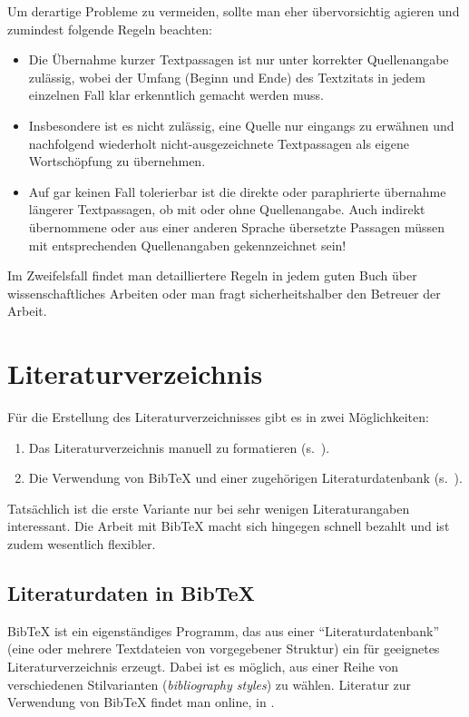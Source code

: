 Um derartige Probleme zu vermeiden, sollte man eher übervorsichtig agieren und zumindest folgende Regeln beachten:
%
\begin{itemize}
\item
Die Übernahme kurzer Textpassagen ist nur unter korrekter Quellenangabe zulässig, wobei der Umfang (Beginn und Ende) des Textzitats in jedem einzelnen Fall klar erkenntlich gemacht werden muss. 
\item
Insbesondere ist es nicht zulässig, eine Quelle nur eingangs zu erwähnen und nachfolgend wiederholt nicht-ausgezeichnete Textpassagen als eigene Wortschöpfung zu übernehmen. 
\item
Auf gar keinen Fall tolerierbar ist die direkte oder paraphrierte übernahme längerer Textpassagen, ob mit oder ohne Quellenangabe. Auch indirekt übernommene oder aus einer anderen Sprache übersetzte Passagen müssen mit entsprechenden Quellenangaben gekennzeichnet sein! 
\end{itemize}
%
Im Zweifelsfall findet man detailliertere Regeln in jedem guten Buch über wissenschaftliches Arbeiten oder man fragt sicherheitshalber den Betreuer der Arbeit.



\section{Literaturverzeichnis}

Für die Erstellung des Literaturverzeichnisses gibt es in \latex zwei
Möglichkeiten:
\begin{enumerate}
\item Das Literaturverzeichnis manuell zu formatieren (s.\ \cite[S.\ 56--57]{Kopka98}).
\item Die Verwendung von BibTeX und einer zugehörigen Literaturdatenbank
(s.\ \cite[S.\ 245--255]{Kopka98}).
\end{enumerate}
Tatsächlich ist die erste Variante nur bei sehr wenigen Literaturangaben interessant.
Die Arbeit mit BibTeX macht sich hingegen schnell bezahlt und ist zudem wesentlich
flexibler.

\subsection{Literaturdaten in BibTeX}
\label{sec:bibtex}

BibTeX ist ein eigenständiges Programm, das aus einer "`Literaturdatenbank"' (eine oder mehrere
Textdateien von vorgegebener Struktur) ein für \latex geeignetes Literaturverzeichnis
erzeugt. Dabei ist es möglich, aus einer Reihe von verschiedenen Stilvarianten
(\emph{bibliography styles}) zu wählen.
Literatur zur Verwendung von BibTeX findet man online, \zB in
\cite{Taylor96,Patashnik88}.

